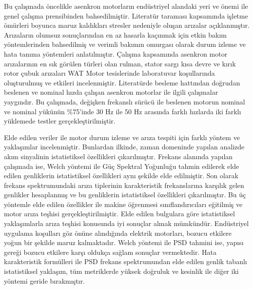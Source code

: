 Bu çalışmada öncelikle asenkron motorların endüstriyel alandaki yeri ve önemi ile genel çalışma prensibinden bahsedilmiştir. Literatür taraması kapsamında işletme ömürleri boyunca maruz kaldıkları stresler nedeniyle oluşan arızalar açıklanmıştır. Arızaların olumsuz sonuçlarından en az hasarla kaçınmak için etkin bakım yöntemlerinden bahsedilmiş ve verimli bakımın omurgası olarak durum izleme ve hata tanıma yöntemleri anlatılmıştır. Çalışma kapsamında asenkron motor arızalarının en sık görülen türleri olan rulman, stator sargı kısa devre ve kırık rotor çubuk arızaları WAT Motor tesislerinde laboratuvar koşullarında oluşturulmuş ve etkileri incelenmiştir. Literatürde besleme hattından doğrudan beslenen ve nominal hızda çalışan asenkron motorlar ile ilgili çalışmalar yaygındır. Bu çalışmada, değişken frekanslı sürücü ile beslenen motorun nominal ve nominal yükünün \%75'inde 30 Hz ile 50 Hz arasında farklı hızlarda iki farklı yüklemede testler gerçekleştirilmiştir.

Elde edilen veriler ile motor durum izleme ve arıza tespiti için farklı yöntem ve yaklaşımlar incelenmiştir. Bunlardan ilkinde, zaman domeninde yapılan analizde akım sinyalinin istatistiksel özellikleri çıkarılmıştır. Frekans alanında yapılan çalışmada ise, Welch yöntemi ile Güç Spektral Yoğunluğu tahmin edilerek elde edilen genliklerin istatistiksel özellikleri aynı şekilde elde edilmiştir. Son olarak frekans spektrumundaki arıza tiplerinin karakteristik frekanslarına karşılık gelen genlikler hesaplanmış ve bu genliklerin istatistiksel özellikleri çıkarılmıştır. Bu üç yöntemle elde edilen özellikler ile makine öğrenmesi sınıflandırıcıları eğitilmiş ve motor arıza teşhisi gerçekleştirilmiştir. Elde edilen bulgulara göre istatistiksel yaklaşımlarla arıza teşhisi konusunda iyi sonuçlar almak mümkündür. Endüstriyel uygulama koşulları göz önüne alındığında elektrik motorları, bozucu etkilere yoğun bir şekilde maruz kalmaktadır. Welch yöntemi ile PSD tahmini ise, yapısı gereği bozucu etkilere karşı oldukça sağlam sonuçlar vermektedir. Hata karakteristik formülleri ile PSD frekans spektrumundan elde edilen genlik tabanlı istatistiksel yaklaşım, tüm metriklerde yüksek doğruluk ve kesinlik ile diğer iki yöntemi geride bırakmıştır.

